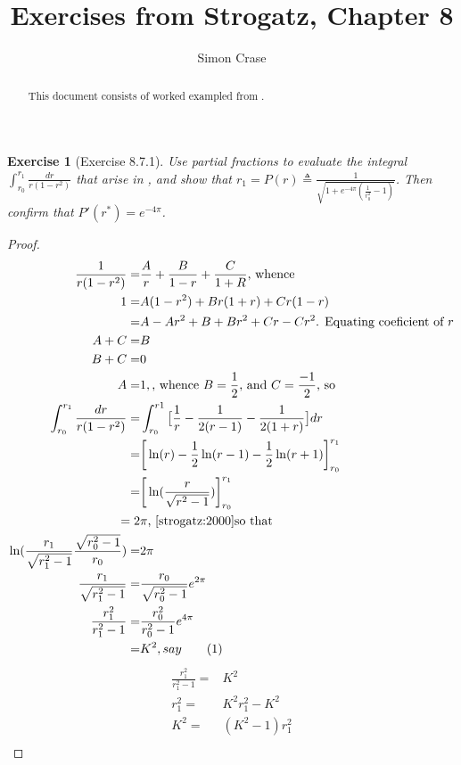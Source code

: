 \documentclass[]{article}
\title{Exercises from Strogatz, Chapter 8}
\author{Simon Crase}
\newtheorem{ex}{Exercise}
\newcommand\numberthis{\addtocounter{equation}{1}\tag{\theequation}}
\begin{document}
\maketitle

\begin{abstract}
This document consists of worked exampled from \cite[Chapter 8]{strogatz:2000}.
\end{abstract}

\begin{ex}[Exercise 8.7.1]
	Use partial fractions to evaluate the integral $\int_{r_0}^{r_1}\frac{dr}{r(1-r^2)}$ that arise in \cite[Example 8.7.1]{strogatz:2000}, and show that $r_1=P(r)\triangleq\frac{1}{\sqrt{1+e^{-4\pi}(\frac{1}{r_0^2}-1)}}$. Then confirm that $P'(r^*)=e^{-4\pi}$.
\end{ex}

\begin{proof}
	\begin{align*}
	\frac{1}{r(1-r^2)}=&\frac{A}{r} + \frac{B}{1-r} + \frac{C}{1+R}\text{, whence}\\
	1 =& A(1-r^2) + B r(1+r) + Cr(1-r)\\
	=& A -A r^2 + B + B r^2 +Cr -Cr^2\text{. Equating coeficient of $r$}\\
	A + C =& B\\
	B + C =& 0\\
	A=& 1,\text{, whence $B=\frac{1}{2}$, and $C=\frac{-1}{2}$, so}\\
	\int_{r_0}^{r_1}\frac{dr}{r(1-r^2)}=&\int_{r_0}^{r1} \big[\frac{1}{r}-\frac{1}{2(r-1)}-\frac{1}{2(1+r)}\big] dr\\
	=&\bigg[\ln(r)-\frac{1}{2}\ln(r-1)-\frac{1}{2}\ln(r+1)\bigg]_{r_0}^{r_1}\\
	=&\bigg[\ln(\frac{r}{\sqrt{r^2-1}})\bigg]_{r_0}^{r_1}\\
	=2&\pi\text{, \cite[Example 8.7.1]{strogatz:2000}so that}\\
	\ln(\frac{r_1}{\sqrt{r_1^2-1}}\frac{\sqrt{r_0^2-1}}{r_0})=&2 \pi\\
	\frac{r_1}{\sqrt{r_1^2-1}}=&\frac{r_0}{\sqrt{r_0^2-1}} e^{2 \pi}\\
	\frac{r_1^2}{r_1^2-1}=&\frac{r_0^2}{r_0^2-1} e^{4 \pi}\\
	=&K^2{, say}\numberthis\label{eq:exercise_8_6_1_K}
	\end{align*}
	\begin{align*}
	\frac{r_1^2}{r_1^2-1}=&K^2\\
	r_1^2=&K^2 r_1^2 - K^2\\
	K^2 =& (K^2-1)r_1^2\\

\end{align*}
\end{proof}
\end{document}

